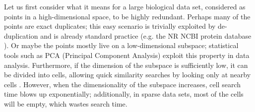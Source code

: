 \documentclass[review,preprint,12pt]{elsarticle}
\renewcommand{\cite}{\citep} %
\theoremstyle{definition}
\theoremstyle{remark}
\numberwithin{equation}{section}
\begin{document}
Let us first consider what it means for a large biological data set, considered as points in a high-dimensional space, to be highly redundant.
Perhaps many of the points are exact duplicates; this easy scenario is trivially exploited by de-duplication and is already standard practice (e.g. the NR NCBI protein database \cite{pruitt2005ncbi}).
Or maybe the points mostly live on a low-dimensional subspace; statistical tools such as PCA (Principal Component Analysis) exploit this property in data analysis.
Furthermore, if the dimension of the subspace is sufficiently low,
it can be divided into cells, allowing quick similarity searches by looking only at nearby cells \cite{weber1998quantitative}.
However, when the dimensionality of the subspace increases, cell search time blows up exponentially; additionally, in sparse data sets, most of the cells will be empty, which wastes search time.
\end{document}
